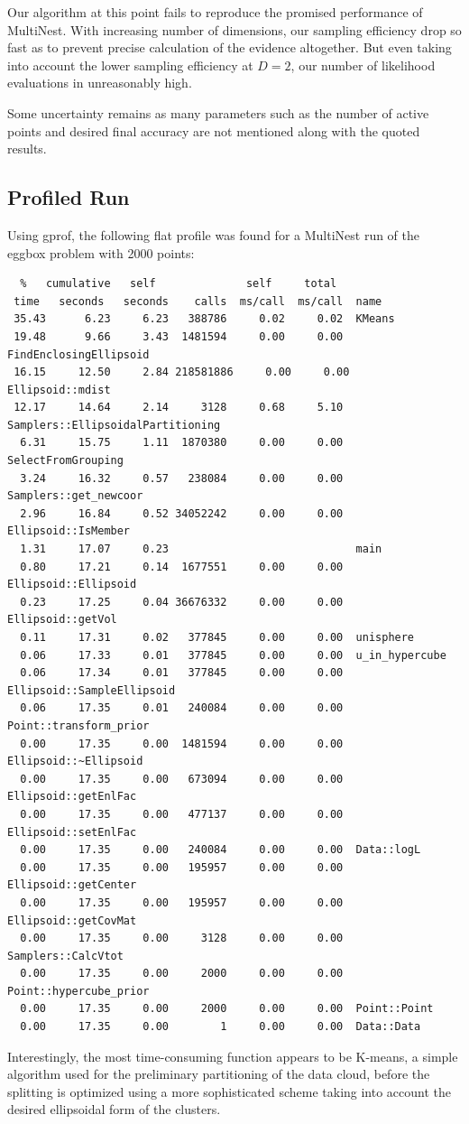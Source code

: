 \documentclass{article}
\begin{document}
Our algorithm at this point fails to reproduce the promised performance of MultiNest. With increasing number of dimensions, our sampling efficiency drop so fast as to prevent precise calculation of the evidence altogether. But even taking into account the lower sampling efficiency at $D=2$, our number of likelihood evaluations in unreasonably high.

Some uncertainty remains as many parameters such as the number of active points and desired final accuracy are not mentioned along with the quoted results.

\subsection{Profiled Run}
Using gprof, the following flat profile was found for a MultiNest run of the eggbox problem with 2000 points:

\begin{verbatim}
  %   cumulative   self              self     total           
 time   seconds   seconds    calls  ms/call  ms/call  name    
 35.43      6.23     6.23   388786     0.02     0.02  KMeans
 19.48      9.66     3.43  1481594     0.00     0.00  FindEnclosingEllipsoid
 16.15     12.50     2.84 218581886     0.00     0.00  Ellipsoid::mdist
 12.17     14.64     2.14     3128     0.68     5.10  Samplers::EllipsoidalPartitioning
  6.31     15.75     1.11  1870380     0.00     0.00  SelectFromGrouping
  3.24     16.32     0.57   238084     0.00     0.00  Samplers::get_newcoor
  2.96     16.84     0.52 34052242     0.00     0.00  Ellipsoid::IsMember
  1.31     17.07     0.23                             main
  0.80     17.21     0.14  1677551     0.00     0.00  Ellipsoid::Ellipsoid
  0.23     17.25     0.04 36676332     0.00     0.00  Ellipsoid::getVol
  0.11     17.31     0.02   377845     0.00     0.00  unisphere
  0.06     17.33     0.01   377845     0.00     0.00  u_in_hypercube
  0.06     17.34     0.01   377845     0.00     0.00  Ellipsoid::SampleEllipsoid
  0.06     17.35     0.01   240084     0.00     0.00  Point::transform_prior
  0.00     17.35     0.00  1481594     0.00     0.00  Ellipsoid::~Ellipsoid
  0.00     17.35     0.00   673094     0.00     0.00  Ellipsoid::getEnlFac
  0.00     17.35     0.00   477137     0.00     0.00  Ellipsoid::setEnlFac
  0.00     17.35     0.00   240084     0.00     0.00  Data::logL
  0.00     17.35     0.00   195957     0.00     0.00  Ellipsoid::getCenter
  0.00     17.35     0.00   195957     0.00     0.00  Ellipsoid::getCovMat
  0.00     17.35     0.00     3128     0.00     0.00  Samplers::CalcVtot
  0.00     17.35     0.00     2000     0.00     0.00  Point::hypercube_prior
  0.00     17.35     0.00     2000     0.00     0.00  Point::Point
  0.00     17.35     0.00        1     0.00     0.00  Data::Data
\end{verbatim}
Interestingly, the most time-consuming function appears to be K-means, a simple algorithm used for the preliminary partitioning of the data cloud, before the splitting is optimized using a more sophisticated scheme taking into account the desired ellipsoidal form of the clusters.
\end{document}
